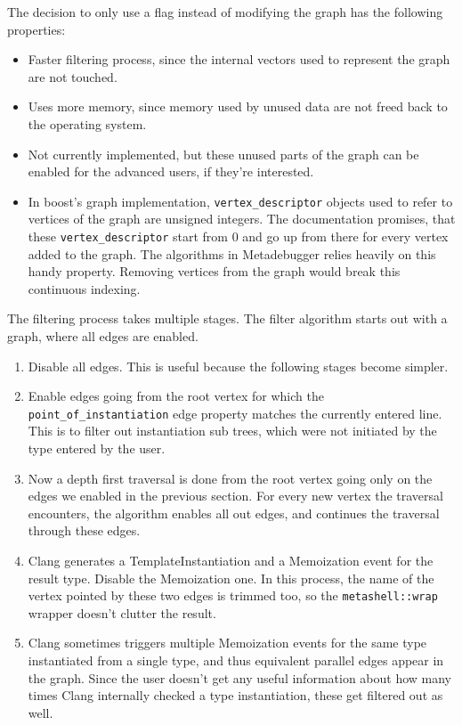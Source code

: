 The decision to only use a flag instead of modifying the graph has the
following properties:

\begin{itemize}
    \item
        Faster filtering process, since the internal vectors used to represent
        the graph are not touched.
    \item
        Uses more memory, since memory used by unused data are not freed back
        to the operating system.
    \item
        Not currently implemented, but these unused parts of the graph can be
        enabled for the advanced users, if they're interested.
    \item
        In boost's graph implementation, \texttt{vertex\_descriptor}
        objects used to refer to vertices of the graph are unsigned integers.
        The documentation promises, that these \texttt{vertex\_descriptor}
        start from 0 and go up from there for every vertex added to the graph.
        The algorithms in Metadebugger relies heavily on this handy property.
        Removing vertices from the graph would break this continuous indexing.
\end{itemize}

The filtering process takes multiple stages. The filter algorithm starts out
with a graph, where all edges are enabled.

\begin{enumerate}
    \item
        Disable all edges. This is useful because the following stages become
        simpler.
    \item
        Enable edges going from the root vertex for which the
        \texttt{point\_of\_instantiation} edge property matches the currently
        entered line. This is to filter out instantiation sub trees, which were
        not initiated by the type entered by the user.
    \item
        Now a depth first traversal is done from the root vertex going only on
        the edges we enabled in the previous section. For every new vertex the
        traversal encounters, the algorithm enables all out edges, and
        continues the traversal through these edges.
    \item
        Clang generates a TemplateInstantiation and a Memoization event for the
        result type. Disable the Memoization one. In this process, the name of
        the vertex pointed by these two edges is trimmed too, so the
        \texttt{metashell::wrap} wrapper doesn't clutter the result.
    \item
        Clang sometimes triggers multiple Memoization events for the same type
        instantiated from a single type, and thus equivalent parallel edges
        appear in the graph. Since the user doesn't get any useful information
        about how many times Clang internally checked a type instantiation,
        these get filtered out as well.
\end{enumerate}

